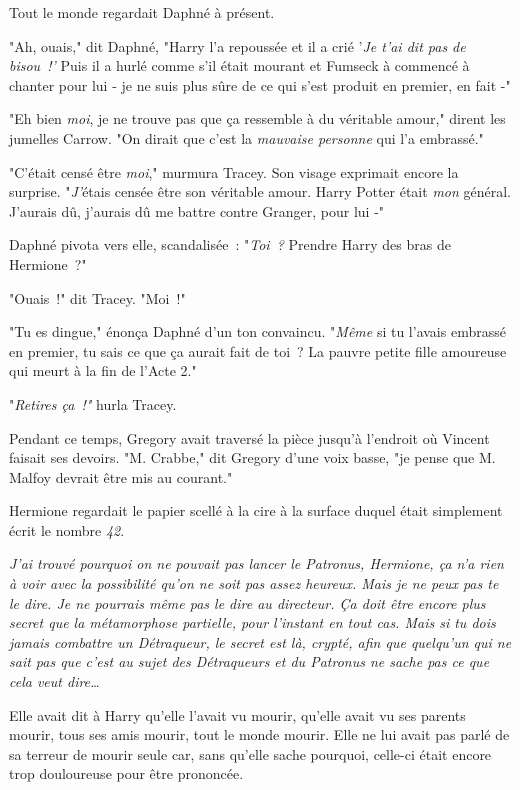 Tout le monde regardait Daphné à présent.

"Ah, ouais," dit Daphné, "Harry l'a repoussée et il a crié '\emph{Je t'ai dit pas de bisou~!'} Puis il a hurlé comme s'il était mourant et Fumseck à commencé à chanter pour lui - je ne suis plus sûre de ce qui s'est produit en premier, en fait -"

"Eh bien \emph{moi}, je ne trouve pas que ça ressemble à du véritable amour," dirent les jumelles Carrow. "On dirait que c'est la \emph{mauvaise personne} qui l'a embrassé."

"C'était censé être \emph{moi}," murmura Tracey. Son visage exprimait encore la surprise. "\emph{J'}étais censée être son véritable amour. Harry Potter était \emph{mon} général. J'aurais dû, j'aurais dû me battre contre Granger, pour lui -"

Daphné pivota vers elle, scandalisée~: "\emph{Toi~?} Prendre Harry des bras de Hermione~?"

"Ouais~!" dit Tracey. "Moi~!"

"Tu es dingue," énonça Daphné d'un ton convaincu. "\emph{Même} si tu l'avais embrassé en premier, tu sais ce que ça aurait fait de toi~? La pauvre petite fille amoureuse qui meurt à la fin de l'Acte 2."

"\emph{Retires ça~!"} hurla Tracey.

Pendant ce temps, Gregory avait traversé la pièce jusqu'à l'endroit où Vincent faisait ses devoirs. "M. Crabbe," dit Gregory d'une voix basse, "je pense que M. Malfoy devrait être mis au courant."


Hermione regardait le papier scellé à la cire à la surface duquel était simplement écrit le nombre \emph{42}.

\emph{J'ai trouvé pourquoi on ne pouvait pas lancer le Patronus, Hermione, ça n'a rien à voir avec la possibilité qu'on ne soit pas assez heureux. Mais je ne peux pas te le dire. Je ne pourrais même pas le dire au directeur. Ça doit être encore plus secret que la métamorphose partielle, pour l'instant en tout cas. Mais si tu dois jamais combattre un Détraqueur, le secret est là, crypté, afin que quelqu'un qui ne sait pas que c'est au sujet des Détraqueurs et du Patronus ne sache pas ce que cela veut dire…}

Elle avait dit à Harry qu'elle l'avait vu mourir, qu'elle avait vu ses parents mourir, tous ses amis mourir, tout le monde mourir. Elle ne lui avait pas parlé de sa terreur de mourir seule car, sans qu'elle sache pourquoi, celle-ci était encore trop douloureuse pour être prononcée.

